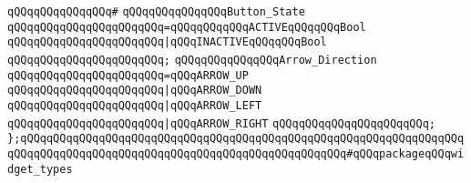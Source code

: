 \verb|qQQqqQQqqQQqqQQq#|\newline
\verb|qQQqqQQqqQQqqQQqButton_State|\newline
\verb|qQQqqQQqqQQqqQQqqQQqqQQq=qQQqqQQqqQQqACTIVEqQQqqQQqBool|\newline
\verb|qQQqqQQqqQQqqQQqqQQqqQQq|\verb#|qQQqINACTIVEqQQqqQQqBool#\newline
\verb|qQQqqQQqqQQqqQQqqQQqqQQq;|\newline
\newline
\verb|qQQqqQQqqQQqqQQqArrow_Direction|\newline
\verb|qQQqqQQqqQQqqQQqqQQqqQQq=qQQqARROW_UP|\newline
\verb|qQQqqQQqqQQqqQQqqQQqqQQq|\verb#|qQQqARROW_DOWN#\newline
\verb|qQQqqQQqqQQqqQQqqQQqqQQq|\verb#|qQQqARROW_LEFT#\newline
\verb|qQQqqQQqqQQqqQQqqQQqqQQq|\verb#|qQQqARROW_RIGHT#\newline
\verb|qQQqqQQqqQQqqQQqqQQqqQQq;|\newline
\newline
\verb|};qQQqqQQqqQQqqQQqqQQqqQQqqQQqqQQqqQQqqQQqqQQqqQQqqQQqqQQqqQQqqQQqqQQqqQQqqQQqqQQqqQQqqQQqqQQqqQQqqQQqqQQqqQQqqQQqqQQqqQQq#qQQqpackageqQQqwidget_types|\newline
\newline

